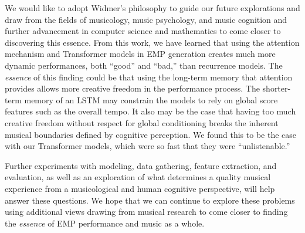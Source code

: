 We would like to adopt Widmer's philosophy to guide our future explorations and draw from the fields of musicology, music psychology, and music cognition and further advancement in computer science and mathematics to come closer to discovering this essence. From this work, we have learned that using the attention mechanism and Transformer models in EMP generation creates much more dynamic performances, both ``good'' and ``bad,'' than recurrence models. The \emph{essence} of this finding could be that using the long-term memory that attention provides allows more creative freedom in the performance process. The shorter-term memory of an LSTM may constrain the models to rely on global score features such as the overall tempo. It also may be the case that having too much creative freedom without respect for global conditioning breaks the inherent musical boundaries defined by cognitive perception. We found this to be the case with our Transformer models, which were so fast that they were ``unlistenable.'' 

Further experiments with modeling, data gathering, feature extraction, and evaluation, as well as an exploration of what determines a quality musical experience from a musicological and human cognitive perspective, will help answer these questions. We hope that we can continue to explore these problems using additional views drawing from musical research to come closer to finding the \emph{essence} of EMP performance and music as a whole. 
